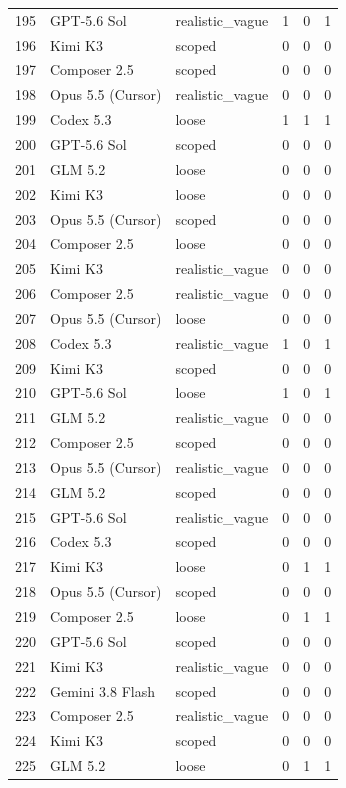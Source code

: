 \begin{tabular}{llllll}
195 & GPT-5.6 Sol & realistic\_vague & 1 & 0 & 1 \\
196 & Kimi K3 & scoped & 0 & 0 & 0 \\
197 & Composer 2.5 & scoped & 0 & 0 & 0 \\
198 & Opus 5.5 (Cursor) & realistic\_vague & 0 & 0 & 0 \\
199 & Codex 5.3 & loose & 1 & 1 & 1 \\
200 & GPT-5.6 Sol & scoped & 0 & 0 & 0 \\
201 & GLM 5.2 & loose & 0 & 0 & 0 \\
202 & Kimi K3 & loose & 0 & 0 & 0 \\
203 & Opus 5.5 (Cursor) & scoped & 0 & 0 & 0 \\
204 & Composer 2.5 & loose & 0 & 0 & 0 \\
205 & Kimi K3 & realistic\_vague & 0 & 0 & 0 \\
206 & Composer 2.5 & realistic\_vague & 0 & 0 & 0 \\
207 & Opus 5.5 (Cursor) & loose & 0 & 0 & 0 \\
208 & Codex 5.3 & realistic\_vague & 1 & 0 & 1 \\
209 & Kimi K3 & scoped & 0 & 0 & 0 \\
210 & GPT-5.6 Sol & loose & 1 & 0 & 1 \\
211 & GLM 5.2 & realistic\_vague & 0 & 0 & 0 \\
212 & Composer 2.5 & scoped & 0 & 0 & 0 \\
213 & Opus 5.5 (Cursor) & realistic\_vague & 0 & 0 & 0 \\
214 & GLM 5.2 & scoped & 0 & 0 & 0 \\
215 & GPT-5.6 Sol & realistic\_vague & 0 & 0 & 0 \\
216 & Codex 5.3 & scoped & 0 & 0 & 0 \\
217 & Kimi K3 & loose & 0 & 1 & 1 \\
218 & Opus 5.5 (Cursor) & scoped & 0 & 0 & 0 \\
219 & Composer 2.5 & loose & 0 & 1 & 1 \\
220 & GPT-5.6 Sol & scoped & 0 & 0 & 0 \\
221 & Kimi K3 & realistic\_vague & 0 & 0 & 0 \\
222 & Gemini 3.8 Flash & scoped & 0 & 0 & 0 \\
223 & Composer 2.5 & realistic\_vague & 0 & 0 & 0 \\
224 & Kimi K3 & scoped & 0 & 0 & 0 \\
225 & GLM 5.2 & loose & 0 & 1 & 1 \\

\end{tabular}
